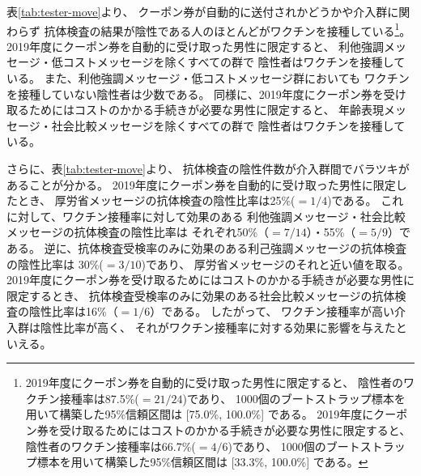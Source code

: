 \documentclass[
  11pt,
  a4paper,
]{article}
\begin{document}
表\ref{tab:tester-move}より、
クーポン券が自動的に送付されかどうかや介入群に関わらず
抗体検査の結果が陰性である人のほとんどがワクチンを接種している\footnote{2019年度にクーポン券を自動的に受け取った男性に限定すると、
  陰性者のワクチン接種率は87.5\%(\(=21/24\))であり、
  1000個のブートストラップ標本を用いて構築した95\%信頼区間は
  {[}75.0\%, 100.0\%{]}
  である。
  2019年度にクーポン券を受け取るためにはコストのかかる手続きが必要な男性に限定すると、
  陰性者のワクチン接種率は66.7\%(\(=4/6\))であり、
  1000個のブートストラップ標本を用いて構築した95\%信頼区間は
  {[}33.3\%, 100.0\%{]}
  である。}。
2019年度にクーポン券を自動的に受け取った男性に限定すると、
利他強調メッセージ・低コストメッセージを除くすべての群で
陰性者はワクチンを接種している。
また、利他強調メッセージ・低コストメッセージ群においても
ワクチンを接種していない陰性者は少数である。
同様に、2019年度にクーポン券を受け取るためにはコストのかかる手続きが必要な男性に限定すると、
年齢表現メッセージ・社会比較メッセージを除くすべての群で
陰性者はワクチンを接種している。

さらに、表\ref{tab:tester-move}より、
抗体検査の陰性件数が介入群間でバラツキがあることが分かる。
2019年度にクーポン券を自動的に受け取った男性に限定したとき、
厚労省メッセージの抗体検査の陰性比率は25\%(\(=1/4\))である。
これに対して、ワクチン接種率に対して効果のある
利他強調メッセージ・社会比較メッセージの抗体検査の陰性比率は
それぞれ50\%（\(=7/14\)）・55\%（\(=5/9\)）である。
逆に、抗体検査受検率のみに効果のある利己強調メッセージの抗体検査の陰性比率は
30\%(\(=3/10\))であり、
厚労省メッセージのそれと近い値を取る。
2019年度にクーポン券を受け取るためにはコストのかかる手続きが必要な男性に限定するとき、
抗体検査受検率のみに効果のある社会比較メッセージの抗体検査の陰性比率は16\%（\(=1/6\)）である。
したがって、
ワクチン接種率が高い介入群は陰性比率が高く、
それがワクチン接種率に対する効果に影響を与えたといえる。
\end{document}
